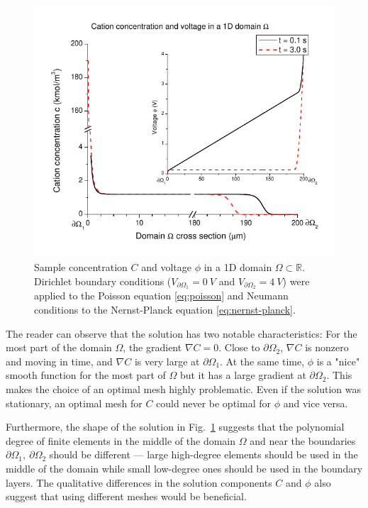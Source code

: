 \begin{figure}[!ht]
  \begin{centering}
      \includegraphics{comsol_conc_volt}
  \caption{Sample concentration $C$ and voltage $\phi$
           in a 1D domain $\Omega\subset\mathbb{R}$.
           Dirichlet boundary conditions ($V_{\partial \Omega_1}=0\ V$
           and $V_{\partial \Omega_2}=4\ V$) were
	   applied to the Poisson equation \eqref{eq:poisson} and Neumann conditions
	   to the Nernst-Planck equation \eqref{eq:nernst-planck}.}
\label{fig:comsol-conc-volt}
  \end{centering}
\end{figure}

The reader can observe that the solution has 
two notable characteristics: For the most part of the domain $\Omega$,
the gradient $\nabla C = 0$. Close to $\partial \Omega_2$, $\nabla C$ is
nonzero and moving in time, and $\nabla C$ is very large at $\partial \Omega_1$.
At the same time, $\phi$ is a "nice" smooth function for the most part of 
$\Omega$ but it has a large gradient at $\partial \Omega_2$.
This makes the choice of an optimal mesh highly problematic. Even if the 
solution was stationary, an optimal mesh for $C$ could never be 
optimal for $\phi$ and vice versa.

Furthermore, the shape of the solution in Fig.~\ref{fig:comsol-conc-volt}
suggests that the polynomial degree of finite elements in the middle
of the domain $\Omega$ and near the boundaries $\partial \Omega_1,\ \partial \Omega_2$
should be different --- large high-degree elements should be used in the middle of the 
domain while small low-degree ones should be used in the boundary layers.  
The qualitative differences in the solution components $C$ and $\phi$ 
also suggest that using different meshes would be beneficial. 




